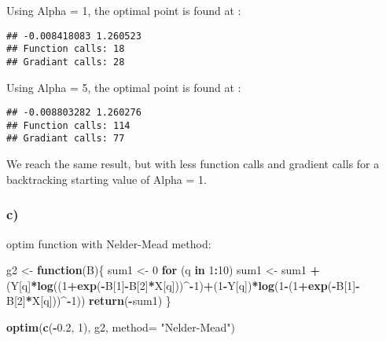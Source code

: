 \documentclass[
]{article}
\newenvironment{Shaded}{\begin{snugshade}}{\end{snugshade}}
\newcommand{\AttributeTok}[1]{\textcolor[rgb]{0.13,0.29,0.53}{#1}}
\newcommand{\ControlFlowTok}[1]{\textcolor[rgb]{0.13,0.29,0.53}{\textbf{#1}}}
\newcommand{\DecValTok}[1]{\textcolor[rgb]{0.00,0.00,0.81}{#1}}
\newcommand{\FloatTok}[1]{\textcolor[rgb]{0.00,0.00,0.81}{#1}}
\newcommand{\FunctionTok}[1]{\textcolor[rgb]{0.13,0.29,0.53}{\textbf{#1}}}
\newcommand{\NormalTok}[1]{#1}
\newcommand{\OtherTok}[1]{\textcolor[rgb]{0.56,0.35,0.01}{#1}}
\newcommand{\SpecialCharTok}[1]{\textcolor[rgb]{0.81,0.36,0.00}{\textbf{#1}}}
\newcommand{\StringTok}[1]{\textcolor[rgb]{0.31,0.60,0.02}{#1}}
\begin{document}
Using Alpha = 1, the optimal point is found at :

\begin{verbatim}
## -0.008418083 1.260523 
## Function calls: 18 
## Gradiant calls: 28
\end{verbatim}

Using Alpha = 5, the optimal point is found at :

\begin{verbatim}
## -0.008803282 1.260276 
## Function calls: 114 
## Gradiant calls: 77
\end{verbatim}

We reach the same result, but with less function calls and gradient
calls for a backtracking starting value of Alpha = 1.

\hypertarget{c-1}{%
\subsubsection{c)}\label{c-1}}

optim function with Nelder-Mead method:

\begin{Shaded}
\begin{Highlighting}[]
\NormalTok{g2 }\OtherTok{\textless{}{-}} \ControlFlowTok{function}\NormalTok{(B)\{}
\NormalTok{  sum1 }\OtherTok{\textless{}{-}} \DecValTok{0}
  \ControlFlowTok{for}\NormalTok{ (q }\ControlFlowTok{in} \DecValTok{1}\SpecialCharTok{:}\DecValTok{10}\NormalTok{)}
\NormalTok{    sum1 }\OtherTok{\textless{}{-}}\NormalTok{ sum1 }\SpecialCharTok{+}\NormalTok{ (Y[q]}\SpecialCharTok{*}\FunctionTok{log}\NormalTok{((}\DecValTok{1}\SpecialCharTok{+}\FunctionTok{exp}\NormalTok{(}\SpecialCharTok{{-}}\NormalTok{B[}\DecValTok{1}\NormalTok{]}\SpecialCharTok{{-}}\NormalTok{B[}\DecValTok{2}\NormalTok{]}\SpecialCharTok{*}\NormalTok{X[q]))}\SpecialCharTok{\^{}{-}}\DecValTok{1}\NormalTok{)}\SpecialCharTok{+}\NormalTok{(}\DecValTok{1}\SpecialCharTok{{-}}\NormalTok{Y[q])}\SpecialCharTok{*}\FunctionTok{log}\NormalTok{(}\DecValTok{1}\SpecialCharTok{{-}}\NormalTok{(}\DecValTok{1}\SpecialCharTok{+}\FunctionTok{exp}\NormalTok{(}\SpecialCharTok{{-}}\NormalTok{B[}\DecValTok{1}\NormalTok{]}\SpecialCharTok{{-}}\NormalTok{B[}\DecValTok{2}\NormalTok{]}\SpecialCharTok{*}\NormalTok{X[q]))}\SpecialCharTok{\^{}{-}}\DecValTok{1}\NormalTok{))}
  \FunctionTok{return}\NormalTok{(}\SpecialCharTok{{-}}\NormalTok{sum1)}
\NormalTok{\}}

\FunctionTok{optim}\NormalTok{(}\FunctionTok{c}\NormalTok{(}\SpecialCharTok{{-}}\FloatTok{0.2}\NormalTok{, }\DecValTok{1}\NormalTok{), g2, }\AttributeTok{method=} \StringTok{"Nelder{-}Mead"}\NormalTok{)}
\end{Highlighting}
\end{Shaded}
\end{document}
